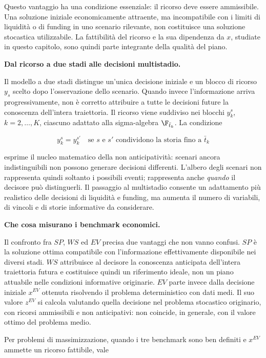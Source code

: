 Questo vantaggio ha una condizione essenziale: il ricorso deve
essere ammissibile. Una soluzione iniziale economicamente
attraente, ma incompatibile con i limiti di liquidit\`a o di
funding in uno scenario rilevante, non costituisce una soluzione
stocastica utilizzabile. La fattibilit\`a del ricorso e la sua
dipendenza da $x$, studiate in questo capitolo, sono quindi parte
integrante della qualit\`a del piano.

\medskip
\noindent
\textbf{Dal ricorso a due stadi alle decisioni multistadio.}

Il modello a due stadi distingue un'unica decisione iniziale e
un blocco di ricorso $y_s$ scelto dopo l'osservazione dello
scenario. Quando invece l'informazione arriva progressivamente,
non \`e corretto attribuire a tutte le decisioni future la
conoscenza dell'intera traiettoria. Il ricorso viene suddiviso nei
blocchi $y_k^s$, $k=2,\ldots,K$, ciascuno adattato alla
sigma-algebra $\F_{\bar t_k}$. La condizione

\[
y_k^s=y_k^{s'}
\quad\text{se }s\text{ e }s'\text{ condividono la storia fino a }\bar t_k
\]

\noindent
esprime il nucleo matematico della non anticipativit\`a:
scenari ancora indistinguibili non possono generare decisioni
differenti. L'albero degli scenari non rappresenta quindi soltanto
i possibili eventi; rappresenta anche \emph{quando} il decisore
pu\`o distinguerli. Il passaggio al multistadio consente un
adattamento pi\`u realistico delle decisioni di liquidit\`a e
funding, ma aumenta il numero di variabili, di vincoli e di
storie informative da considerare.

\medskip
\noindent
\textbf{Che cosa misurano i benchmark economici.}

Il confronto fra $SP$, $WS$ ed $EV$ precisa due vantaggi che non
vanno confusi. $SP$ \`e la soluzione ottima compatibile con
l'informazione effettivamente disponibile nei diversi stadi.
$WS$ attribuisce al decisore la conoscenza anticipata dell'intera
traiettoria futura e costituisce quindi un riferimento ideale,
non un piano attuabile nelle condizioni informative originarie.
$EV$ parte invece dalla decisione iniziale $x^{EV}$ ottenuta
risolvendo il problema deterministico con dati medi. Il suo valore
$z^{EV}$ si calcola valutando quella decisione nel problema
stocastico originario, con ricorsi ammissibili e non anticipativi:
non coincide, in generale, con il valore ottimo del problema medio.

Per problemi di massimizzazione, quando i tre benchmark sono ben
definiti e $x^{EV}$ ammette un ricorso fattibile, vale

